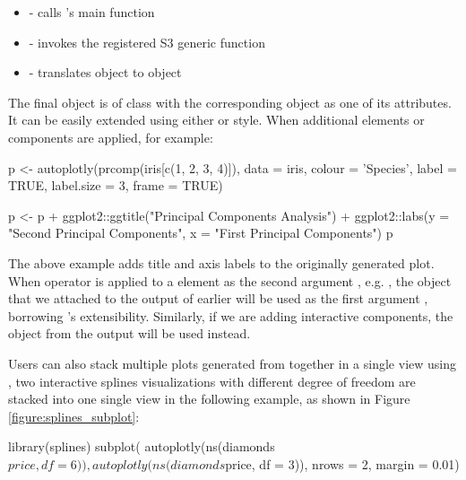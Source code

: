 \begin{itemize}
\tightlist
\item
   - calls 's main
  function
\item
   - invokes the registered S3
  generic function
\item
   - translates
   object to  object
\end{itemize}

The final object is of class  with the corresponding
 object as one of its attributes. It can be easily extended
using either  or  style. When additional
 elements or components are applied, for example:

\begin{Schunk}
\begin{Sinput}
p <- autoplotly(prcomp(iris[c(1, 2, 3, 4)]), data = iris,
  colour = 'Species', label = TRUE, label.size = 3, frame = TRUE)

p <- p +
  ggplot2::ggtitle("Principal Components Analysis") +
  ggplot2::labs(y = "Second Principal Components", x = "First Principal Components")
p
\end{Sinput}
\end{Schunk}

The above example adds title and axis labels to the originally generated
plot. When  operator is applied to a
 element as the second argument , e.g.
, the  object that we attached
to the output of  earlier will be used as the first
argument , borrowing 's extensibility. Similarly,
if we are adding  interactive components, the 
object from the output  will be used instead.

Users can also stack multiple plots generated from 
together in a single view using , two interactive
splines visualizations with different degree of freedom are stacked into
one single view in the following example, as shown in Figure
\ref{figure:splines_subplot}:

\begin{Schunk}
\begin{Sinput}
library(splines)
subplot(
  autoplotly(ns(diamonds$price, df = 6)),
  autoplotly(ns(diamonds$price, df = 3)), nrows = 2, margin = 0.01)
\end{Sinput}
\end{Schunk}


